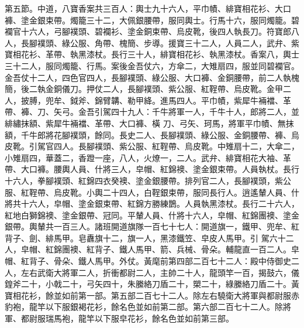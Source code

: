 \begin{pinyinscope}
 第五節。中道，八寶香案共三百人：輿士九十六人，平巾幘、緋寶相花衫、大口褲、塗金銀束帶。燭籠三十二，大佩銀腰帶，服同輿士。行馬十六，服同燭籠。碧襴官十六人，弓腳襆頭、碧襴衫、塗金銅束帶、烏皮靴，後四人執長刀。符寶郎八人，長腳襆頭、綠公服、角帶、槐簡、步導。援寶三十二人，人員二人，武弁、紫寶相花衫、革帶、執黑漆杖。長行三十人，緋寶相花衫、執黑漆杖。香案八，輿士三十二人，服同燭籠、行馬。案後金吾仗六，方傘二，大雉扇四，服並同碧襴官。金吾仗十二人，四色官四人，長腳襆頭、綠公服、大口褲、金銅腰帶，前二人執槐簡，後二執金銅儀刀。押仗二人，長腳襆頭、紫公服、紅鞓帶、烏皮靴。金甲二人，披膊，兜牟、鉞斧、錦臂韝、勒甲絳。進馬四人。平巾幘，紫犀牛裲襠、革帶、褲、刀、矢弓。金吾引駕四十九人：千牛將軍一人，千牛十人，郎將二人，並緋繡抹額、紫犀牛裲襠、革帶、大口褲、橫
 刀、弓矢、珂馬，將軍平巾幘、無抹額，千牛郎將花腳襆頭，餘同。長史二人、長腳襆頭、綠公服、金銅腰帶、褲、烏皮靴。引駕官四人。長腳襆頭、紫公服、紅鞓帶、烏皮靴。中雉扇十二，大傘二，小雉扇四，華蓋二，香蹬一座，八人，火燎一，二人。武弁、緋寶相花大袖、革帶、大口褲。腰輿人員、什將三人，皁帽、紅錦襖、塗金銀束帶。人員執杖。長行十六人，拳腳襆頭、紅錦四衣癸襖、塗金銀腰帶。排列官二人，長腳襆頭，紫公服、紅鞓帶、烏皮靴。小輿二十四人，白鞓銀束帶，服同長行人。逍遙輦人員、什將共十六人，皁帽、塗金銀束帶、紅錦方勝練鵲。人員執黑漆杖。長行二十六人，紅地白獅錦襖、塗金銀帶、冠同。平輦人員、什將十六人，皁帽、紅錦團襖、塗金銀帶。輿輦共一百三人。諸班開道旗隊一百七十七人：開道旗一，鐵甲、兜牟、紅背子、劍、緋馬甲。皂纛旗十二，旗一人，黑漆鐵笠、皁皮人馬甲。引
 駕六十二人，皁帽、紅錦團襖、紅背子、鐵人馬甲、箭、兵械、骨朵。輔龍直一百二人。皁帽、紅背子、骨朵、鐵人馬甲。外仗。黃麾前第四部二百七十二人：殿中侍御史二人，左右武衛大將軍二人，折衝都尉二人，主帥二十人，龍頭竿一百，揭鼓六，儀鍠斧二十，小戟二十，弓矢四十，朱縢絡刀盾二十，槊二十，綠縢絡刀盾二十。黃寶相花衫，餘並如前第一部。第五部二百七十二人。除左右驍衛大將軍與都尉服赤豹袍，龍竿以下服銀褐花衫，餘名色並如前第二部。第六部二百七十二人。除將軍、都尉服瑞馬袍，龍竿以下服皁花衫，餘名色並如前第三部。




\end{pinyinscope}
